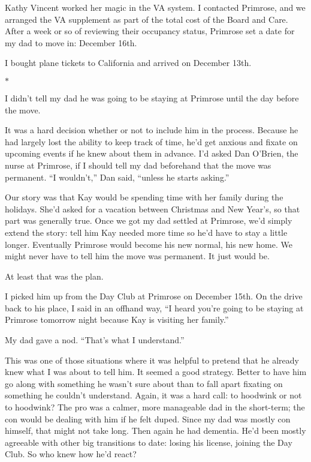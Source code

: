 \documentclass[12pt]{book}
\begin{document}
Kathy Vincent worked her magic in the VA system. I contacted Primrose, and we arranged the VA supplement as part of the total cost of the Board and Care. After a week or so of reviewing their occupancy status, Primrose set a date for my dad to move in: December 16th.

I bought plane tickets to California and arrived on December 13th.

\begin{center}$*$\end{center}

I didn't tell my dad he was going to be staying at Primrose until the day before the move.

It was a hard decision whether or not to include him in the process. Because he had largely lost the ability to keep track of time, he'd get anxious and fixate on upcoming events if he knew about them in advance. I'd asked Dan O'Brien, the nurse at Primrose, if I should tell my dad beforehand that the move was permanent. ``I wouldn't,'' Dan said, ``unless he starts asking.''

Our story was that Kay would be spending time with her family during the holidays. She'd asked for a vacation between Christmas and New Year's, so that part was generally true. Once we got my dad settled at Primrose, we'd simply extend the story: tell him Kay needed more time so he'd have to stay a little longer. Eventually Primrose would become his new normal, his new home. We might never have to tell him the move was permanent. It just would be.

At least that was the plan.

I picked him up from the Day Club at Primrose on December 15th. On the drive back to his place, I said in an offhand way, ``I heard you're going to be staying at Primrose tomorrow night because Kay is visiting her family.''

My dad gave a nod. ``That's what I understand.''

This was one of those situations where it was helpful to pretend that he already knew what I was about to tell him. It seemed a good strategy. Better to have him go along with something he wasn't sure about than to fall apart fixating on something he couldn't understand. Again, it was a hard call: to hoodwink or not to hoodwink? The pro was a calmer, more manageable dad in the short-term; the con would be dealing with him if he felt duped. Since my dad was mostly con himself, that might not take long. Then again he had dementia. He'd been mostly agreeable with other big transitions to date: losing his license, joining the Day Club. So who knew how he'd react?
\end{document}
